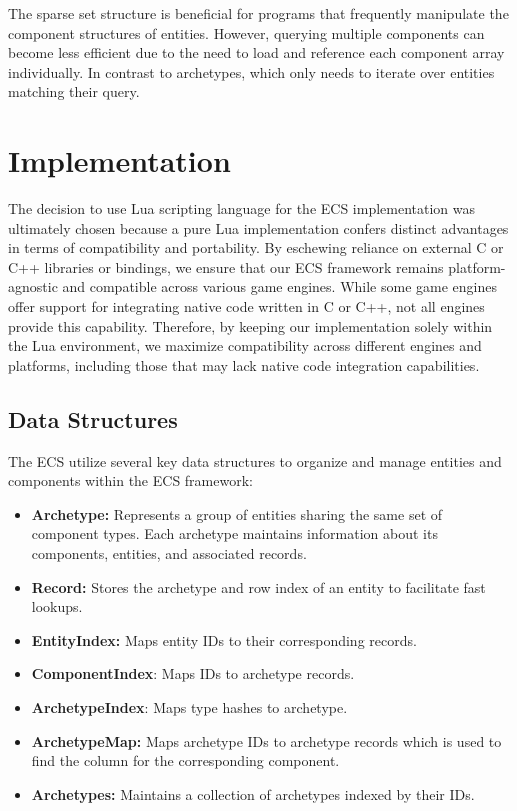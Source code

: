 \documentclass[openany, amssymb, psamsfonts]{amsart}
\theoremstyle{definition}
\numberwithin{equation}{section}
\begin{document}
The sparse set structure is beneficial for programs that frequently manipulate the component structures of entities. However, querying multiple components can become less efficient due to the need to load and reference each component array individually. In contrast to archetypes, which only needs to iterate over entities matching their query. 

\section{Implementation}
The decision to use Lua scripting language for the ECS implementation was ultimately chosen because
a pure Lua implementation confers distinct advantages in terms 
of compatibility and portability. By eschewing reliance on external C or C++ libraries 
or bindings, we ensure that our ECS framework remains platform-agnostic and 
compatible across various game engines. While some game engines offer support 
for integrating native code written in C or C++, not all engines provide this capability. 
Therefore, by keeping our implementation solely within the Lua environment, 
we maximize compatibility across different engines and platforms, 
including those that may lack native code integration capabilities.

\subsection{Data Structures}

The ECS utilize several key data structures to organize and manage entities and components within the ECS framework:

\begin{itemize}
    \item \textbf{Archetype:} Represents a group of entities sharing the same set of component types. Each archetype maintains information about its components, entities, and associated records. 
    
    \item \textbf{Record:} Stores the archetype and row index of an entity to facilitate fast lookups.
    
    \item \textbf{EntityIndex:} Maps entity IDs to their corresponding records.

    \item \textbf{ComponentIndex}: Maps IDs to archetype records. 

    \item \textbf{ArchetypeIndex}: Maps type hashes to archetype. 

    \item \textbf{ArchetypeMap:} Maps archetype IDs to archetype records which is used to find the column for the corresponding component.
    
    \item \textbf{Archetypes:} Maintains a collection of archetypes indexed by their IDs.
\end{itemize}
\end{document}
